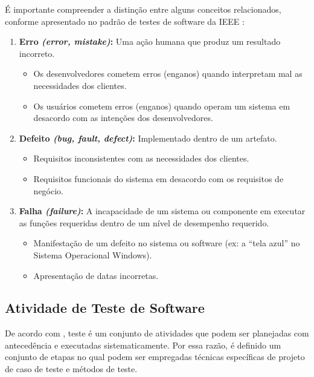 É importante compreender a distinção entre alguns conceitos relacionados, conforme apresentado no padrão de testes de software da IEEE \cite{159342}:

\begin{enumerate}
    \item \textbf{Erro \textit{(error, mistake)}:} Uma ação humana que produz um resultado incorreto.
    
    \begin{itemize}
        \item Os desenvolvedores cometem erros (enganos) quando interpretam mal as necessidades dos clientes.
        \item Os usuários cometem erros (enganos) quando operam um sistema em desacordo com as intenções dos desenvolvedores.
    \end{itemize}
    
    \item \textbf{Defeito \textit{(bug, fault, defect)}:} Implementado dentro de um artefato.
    
    \begin{itemize}
        \item Requisitos inconsistentes com as necessidades dos clientes.
        \item Requisitos funcionais do sistema em desacordo com os requisitos de
negócio.
    \end{itemize}
    
     \item \textbf{Falha \textit{(failure)}:} A incapacidade de um sistema ou componente em executar
as funções requeridas dentro de um nível de desempenho requerido.

    \begin{itemize}
        \item Manifestação de um defeito no sistema ou software (ex: a ``tela azul'' no Sistema Operacional Windows).
        \item Apresentação de datas incorretas.
    \end{itemize}
    
\end{enumerate}

\subsection{Atividade de Teste de Software}

 De acordo com , teste é um conjunto de atividades que podem ser planejadas com antecedência e executadas sistematicamente. Por essa razão, é definido um conjunto de etapas no qual podem ser empregadas técnicas específicas de projeto de caso de teste e métodos de teste.

